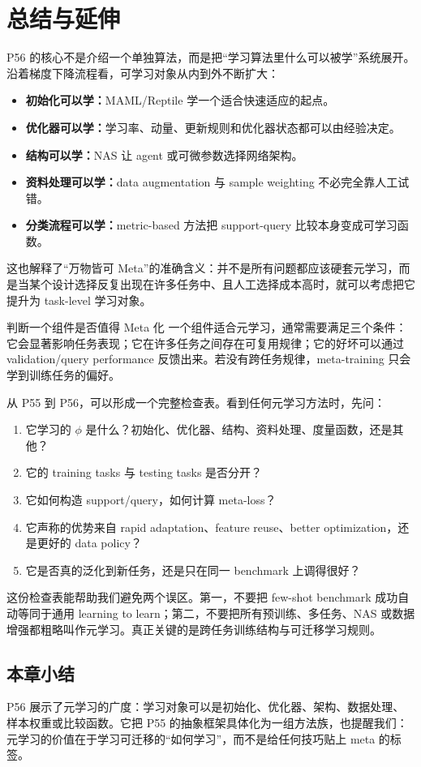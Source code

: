 \documentclass[a4paper]{article}
\begin{document}
\section{总结与延伸}

P56 的核心不是介绍一个单独算法，而是把“学习算法里什么可以被学”系统展开。沿着梯度下降流程看，可学习对象从内到外不断扩大：
\begin{itemize}
    \item \textbf{初始化可以学：}MAML/Reptile 学一个适合快速适应的起点。
    \item \textbf{优化器可以学：}学习率、动量、更新规则和优化器状态都可以由经验决定。
    \item \textbf{结构可以学：}NAS 让 agent 或可微参数选择网络架构。
    \item \textbf{资料处理可以学：}data augmentation 与 sample weighting 不必完全靠人工试错。
    \item \textbf{分类流程可以学：}metric-based 方法把 support-query 比较本身变成可学习函数。
\end{itemize}

这也解释了“万物皆可 Meta”的准确含义：并不是所有问题都应该硬套元学习，而是当某个设计选择反复出现在许多任务中、且人工选择成本高时，就可以考虑把它提升为 task-level 学习对象。

\begin{importantbox}{判断一个组件是否值得 Meta 化}
    一个组件适合元学习，通常需要满足三个条件：它会显著影响任务表现；它在许多任务之间存在可复用规律；它的好坏可以通过 validation/query performance 反馈出来。若没有跨任务规律，meta-training 只会学到训练任务的偏好。
\end{importantbox}

从 P55 到 P56，可以形成一个完整检查表。看到任何元学习方法时，先问：
\begin{enumerate}
    \item 它学习的 $\phi$ 是什么？初始化、优化器、结构、资料处理、度量函数，还是其他？
    \item 它的 training tasks 与 testing tasks 是否分开？
    \item 它如何构造 support/query，如何计算 meta-loss？
    \item 它声称的优势来自 rapid adaptation、feature reuse、better optimization，还是更好的 data policy？
    \item 它是否真的泛化到新任务，还是只在同一 benchmark 上调得很好？
\end{enumerate}

这份检查表能帮助我们避免两个误区。第一，不要把 few-shot benchmark 成功自动等同于通用 learning to learn；第二，不要把所有预训练、多任务、NAS 或数据增强都粗略叫作元学习。真正关键的是跨任务训练结构与可迁移学习规则。

\subsection{本章小结}

P56 展示了元学习的广度：学习对象可以是初始化、优化器、架构、数据处理、样本权重或比较函数。它把 P55 的抽象框架具体化为一组方法族，也提醒我们：元学习的价值在于学习可迁移的“如何学习”，而不是给任何技巧贴上 meta 的标签。
\end{document}
